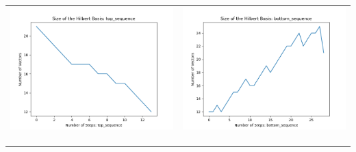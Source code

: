 \documentclass[10pt]{article}
\begin{document}
\begin{tabular}{c|c}
\begin{minipage}{.4\textwidth}
\includegraphics[width=\textwidth]{"DATA/5d/6 generators 2 bound D/top_sequence SIZE"}
\end{minipage} &
\begin{minipage}{.4\textwidth}
\includegraphics[width=\textwidth]{"DATA/5d/6 generators 2 bound D bottomup/bottom_sequence SIZE"}
\end{minipage} \\ \\
\hline \\\begin{minipage}{.4\textwidth}

\end{minipage}
\end{tabular}
\end{document}
